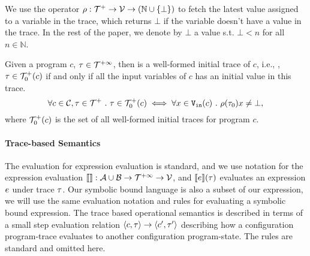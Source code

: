 We use the operator $\rho : {\mathcal{T}^{+}}  \to \mathcal{V} \to(\mathbb{N} \cup \{\bot\})$ to fetch the latest value assigned to a variable in the trace, which returns $\bot$ if the variable doesn't have a value in the trace.
In the rest of the paper, we denote by $\bot$ a value s.t. $\bot < n $ for all $n \in \mathbb{N}$.
%
%
%
\begin{defn}
  \label{def:initial_trace}
  Given a program $c$, $\mathtt{\tau} \in \mathcal{T}^{+\infty}$, then is a well-formed initial trace of $c$, i.e., , $\mathtt{\tau} \in \mathcal{T}^{+}_0(c)$ if and only if all the input variables of $c$ has an initial value in this trace.
  \[
    \forall c \in \mathcal{C}, \mathtt{\tau} \in \mathcal{T}^{+} ~.~ \mathtt{\tau} \in \mathcal{T}^{+}_0(c) \iff 
    \forall x \in {\ensuremath{\mathtt{V_{\mathtt{in}}}}}(c) ~.~ \rho(\mathtt{\tau}_0) x \neq \bot,
    \]
where $\mathcal{T}^{+}_0(c)$ is the set of all well-formed initial traces for program $c$.
\end{defn}
%
%
\paragraph{Trace-based Semantics}
The evaluation for expression evaluation is standard, and 
we use notation for the expression evaluation $\llbracket  \rrbracket : \mathcal{A} \cup \mathcal{B} \to \mathcal{T}^{+\infty} \to \mathcal{V}$, and $\llbracket e \rrbracket(\mathtt{\tau})$ evaluates an expression $e$ under trace $\mathtt{\tau}$.
Our symbolic bound language is also a subset of our expression, we will use the same evaluation notation and rules for evaluating a symbolic bound expression.
The trace based operational semantics is described in terms of a small step evaluation relation $\langle c, \mathtt{\tau} \rangle \to \langle c', \mathtt{\tau}' \rangle$ describing how a configuration program-trace evaluates to another configuration
program-state.
The rules are standard and omitted here.

